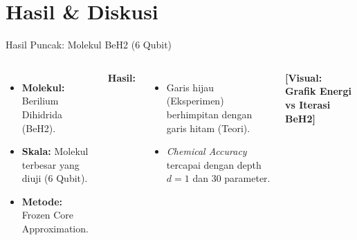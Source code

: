 \documentclass[aspectratio=169, 10pt]{beamer}
\begin{document}
\section{Hasil \& Diskusi}

\begin{frame}{Hasil Puncak: Molekul BeH2 (6 Qubit)}
    \begin{columns}
        \begin{itemize}
            \item \textbf{Molekul:} Berilium Dihidrida (BeH2).
            \item \textbf{Skala:} Molekul terbesar yang diuji (6 Qubit).
            \item \textbf{Metode:} Frozen Core Approximation.
        \end{itemize}
        \vspace{1em}
        \textbf{Hasil:}
        \begin{itemize}
            \item Garis hijau (Eksperimen) berhimpitan dengan garis hitam (Teori).
            \item \textit{Chemical Accuracy} tercapai dengan depth $d=1$ dan 30 parameter.
        \end{itemize}

        \centering
        \textbf{[Visual: Grafik Energi vs Iterasi BeH2]}
        \vspace{3cm} %
    \end{columns}
\end{frame}
\end{document}

